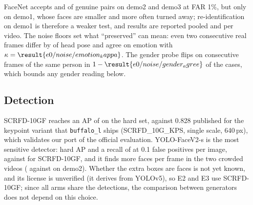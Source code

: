 \begin{table}[ht]\centering
\caption{Noise floor of the utility metrics: the same metric between consecutive real frames.}
\label{tab:noise}

\end{table}

FaceNet accepts  and 
of genuine pairs on demo2 and demo3 at FAR 1\%, but only
 on demo1, whose faces are smaller and more often
turned away; re-identification on demo1 is therefore a weaker test, and results
are reported pooled and per video. The noise floors set what ``preserved'' can
mean: even two consecutive real frames differ by \textdegree{}
of head pose and agree on emotion with $\kappa = \result{e0/noise/emotion_kappa}$.
The gender probe flips on consecutive frames of the same person in
$1 - \result{e0/noise/gender_agree}$ of the cases, which bounds any gender
reading below.

\subsection{Detection}

\begin{table}[ht]\centering
\caption{WIDER FACE validation: official AP and inference cost.}
\label{tab:wider}

\end{table}

\begin{table}[ht]\centering
\caption{Recall-first operating points on WIDER FACE (hard set).}
\label{tab:wider-recall}

\end{table}

\begin{table}[ht]\centering
\caption{The three classroom videos under each detector: faces per frame, tracks,
median track length (frames), share of tracks shorter than 10 frames, and speed.}
\label{tab:e1-videos}

\end{table}

SCRFD-10GF reaches an AP of  on the hard
set, against 0.828 published for the keypoint variant that \texttt{buffalo\_l}
ships (SCRFD\_10G\_KPS, single scale, 640\,px), which validates our port of the
official evaluation. YOLO-FaceV2-s is the most sensitive detector: hard AP
 and a recall of
 at 0.1 false positives
per image, against  for
SCRFD-10GF, and it finds more faces per frame in the two crowded videos
( against
 on demo2). Whether the extra boxes
are faces is not yet known, and its license is unverified (it derives from
YOLOv5), so E2 and E3 use SCRFD-10GF; since all arms share the detections, the
comparison between generators does not depend on this choice.


